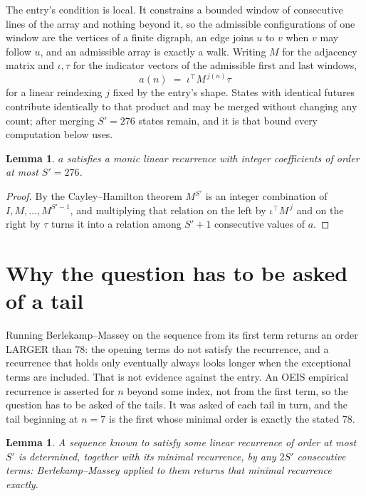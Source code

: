\documentclass[11pt,a4paper]{article}
\theoremstyle{plain}
\newtheorem{lemma}[theorem]{Lemma}
\theoremstyle{definition}
\begin{document}
The entry's condition is local. It constrains a bounded window of consecutive lines of the
array and nothing beyond it, so the admissible configurations of one window are the vertices of
a finite digraph, an edge joins $u$ to $v$ when $v$ may follow $u$, and an admissible array is
exactly a walk. Writing $M$ for the adjacency matrix and $\iota,\tau$ for the indicator vectors
of the admissible first and last windows,
\[
a(n)\;=\;\iota^{\!\top}M^{\,j(n)}\tau
\]
for a linear reindexing $j$ fixed by the entry's shape. States with identical futures
contribute identically to that product and may be merged without changing any count; after
merging $S'=276$ states remain, and it is that bound every computation below uses.

\begin{lemma}\label{lem:cf}
$a$ satisfies a monic linear recurrence with integer coefficients of order at most $S'=276$.
\end{lemma}

\begin{proof}
By the Cayley--Hamilton theorem $M^{S'}$ is an integer combination of $I,M,\dots,M^{S'-1}$,
and multiplying that relation on the left by $\iota^{\!\top}M^{\,j}$ and on the right by
$\tau$ turns it into a relation among $S'+1$ consecutive values of $a$.
\end{proof}

\section{Why the question has to be asked of a tail}

Running Berlekamp--Massey on the sequence from its first term returns an order LARGER than $78$: the opening terms do not satisfy the recurrence, and a recurrence that holds only eventually always looks longer when the exceptional terms are included. That is not evidence against the entry. An OEIS empirical recurrence is asserted for $n$ beyond some index, not from the first term, so the question has to be asked of the tails. It was asked of each tail in turn, and the tail beginning at $n=7$ is the first whose minimal order is exactly the stated $78$.

\begin{lemma}\label{lem:bm}
A sequence known to satisfy some linear recurrence of order at most $S'$ is determined,
together with its minimal recurrence, by any $2S'$ consecutive terms: Berlekamp--Massey applied
to them returns that minimal recurrence exactly.
\end{lemma}
\end{document}
